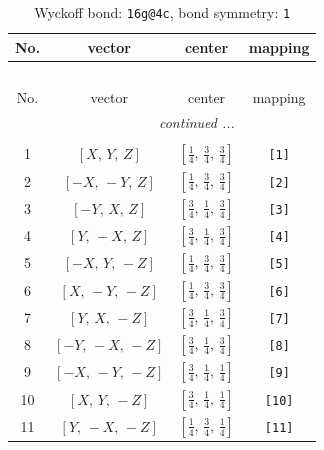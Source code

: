 \documentclass[fleqn,8pt]{jsarticle}
\begin{document}
\begin{longtable}{cccc}
\caption{Wyckoff bond: {\tt 16g@4c}, bond symmetry: {\tt 1}}
 \\
 \hline \hline
No. & vector & center & mapping \\ \hline \endfirsthead

\multicolumn{3}{l}{\tablename\ \thetable{}} \\
 \hline \hline
No. & vector & center & mapping \\ \hline \endhead

 \hline \hline
\multicolumn{3}{r}{\footnotesize\it continued ...} \\ \endfoot

 \hline \hline
\multicolumn{3}{r}{} \\ \endlastfoot

1 & $\left[ X,\, Y,\, Z \right]$ & $\left[ \frac{1}{4},\, \frac{3}{4},\, \frac{3}{4} \right]$ & {\tt [1]} \\ \hline
2 & $\left[ - X,\, - Y,\, Z \right]$ & $\left[ \frac{1}{4},\, \frac{3}{4},\, \frac{3}{4} \right]$ & {\tt [2]} \\ \hline
3 & $\left[ - Y,\, X,\, Z \right]$ & $\left[ \frac{3}{4},\, \frac{1}{4},\, \frac{3}{4} \right]$ & {\tt [3]} \\ \hline
4 & $\left[ Y,\, - X,\, Z \right]$ & $\left[ \frac{3}{4},\, \frac{1}{4},\, \frac{3}{4} \right]$ & {\tt [4]} \\ \hline
5 & $\left[ - X,\, Y,\, - Z \right]$ & $\left[ \frac{1}{4},\, \frac{3}{4},\, \frac{3}{4} \right]$ & {\tt [5]} \\ \hline
6 & $\left[ X,\, - Y,\, - Z \right]$ & $\left[ \frac{1}{4},\, \frac{3}{4},\, \frac{3}{4} \right]$ & {\tt [6]} \\ \hline
7 & $\left[ Y,\, X,\, - Z \right]$ & $\left[ \frac{3}{4},\, \frac{1}{4},\, \frac{3}{4} \right]$ & {\tt [7]} \\ \hline
8 & $\left[ - Y,\, - X,\, - Z \right]$ & $\left[ \frac{3}{4},\, \frac{1}{4},\, \frac{3}{4} \right]$ & {\tt [8]} \\ \hline
9 & $\left[ - X,\, - Y,\, - Z \right]$ & $\left[ \frac{3}{4},\, \frac{1}{4},\, \frac{1}{4} \right]$ & {\tt [9]} \\ \hline
10 & $\left[ X,\, Y,\, - Z \right]$ & $\left[ \frac{3}{4},\, \frac{1}{4},\, \frac{1}{4} \right]$ & {\tt [10]} \\ \hline
11 & $\left[ Y,\, - X,\, - Z \right]$ & $\left[ \frac{1}{4},\, \frac{3}{4},\, \frac{1}{4} \right]$ & {\tt [11]} \\ \hline

\end{longtable}
\end{document}
